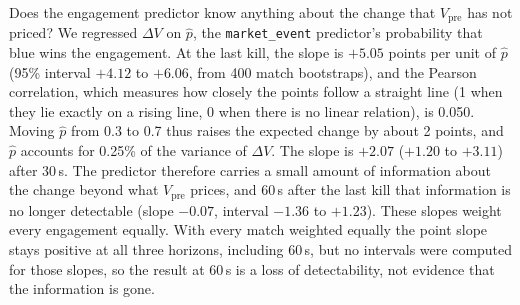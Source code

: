 Does the engagement predictor know anything about the change that $V_{\mathrm{pre}}$ has not priced? We
regressed $\Delta V$ on $\hat p$, the \texttt{market\_event} predictor's probability that blue wins the
engagement. At the last kill, the slope is $+5.05$ points per unit of $\hat p$ (95\% interval $+4.12$ to
$+6.06$, from 400 match bootstraps), and the Pearson correlation, which measures how closely the points
follow a straight line (1 when they lie exactly on a rising line, 0 when there is no linear relation), is
0.050. Moving $\hat p$ from 0.3 to 0.7 thus raises the expected change by about 2 points, and $\hat p$
accounts for 0.25\% of the variance of $\Delta V$. The slope is $+2.07$ ($+1.20$ to $+3.11$) after 30\,s. The predictor therefore carries a small
amount of information about the change beyond what $V_{\mathrm{pre}}$ prices, and 60\,s after the last
kill that information is no longer detectable (slope $-0.07$, interval $-1.36$ to $+1.23$). These slopes
weight every engagement equally. With every match weighted equally the point slope stays positive at all
three horizons, including 60\,s, but no intervals were computed for those slopes, so the result at 60\,s
is a loss of detectability, not evidence that the information is gone.

